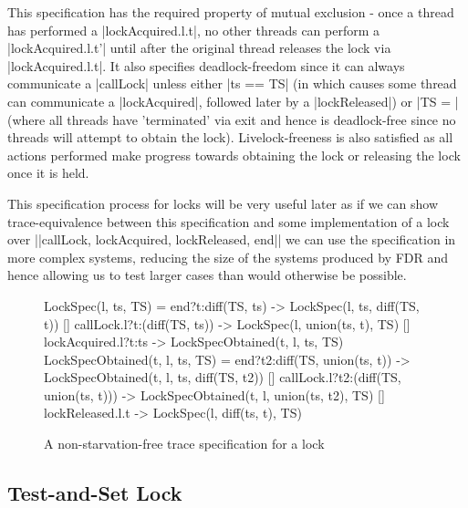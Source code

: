 This specification has the required property of mutual exclusion - once a thread has performed a |lockAcquired.l.t|, no other threads can perform a |lockAcquired.l.t'| until after the original thread releases the lock via |lockAcquired.l.t|. It also specifies deadlock-freedom since it can always communicate a |callLock| unless either |ts == TS| (in which causes some thread can communicate a |lockAcquired|, followed later by a |lockReleased|) or |TS = {}| (where all threads have 'terminated' via exit and hence is deadlock-free since no threads will attempt to obtain the lock). Livelock-freeness is also satisfied as all actions performed make progress towards obtaining the lock or releasing the lock once it is held. 

This specification process for locks will be very useful later as if we can show trace-equivalence between this specification and some implementation of a lock over |{|callLock, lockAcquired, lockReleased, end|}| we can use the specification in more complex systems, reducing the size of the systems produced by FDR and hence allowing us to test larger cases than would otherwise be possible. 

\begin{figure}
\begin{cspm}
  LockSpec(l, ts, TS) = 
    end?t:diff(TS, ts) -> LockSpec(l, ts, diff(TS, t))
    [] callLock.l?t:(diff(TS, ts)) -> LockSpec(l, union(ts, {t}), TS)
    [] lockAcquired.l?t:ts -> LockSpecObtained(t, l, ts, TS)
  LockSpecObtained(t, l, ts, TS) = 
    end?t2:diff(TS, union(ts, t)) -> LockSpecObtained(t, l, ts, diff(TS, t2))
    [] callLock.l?t2:(diff(TS, union(ts, {t}))) -> 
        LockSpecObtained(t, l, union(ts, {t2}), TS)
    [] lockReleased.l.t -> LockSpec(l, diff(ts, {t}), TS)

\end{cspm}
\caption{A non-starvation-free trace specification for a lock}
\label{code:LockSpec}
\end{figure}

\subsection{Test-and-Set Lock}

